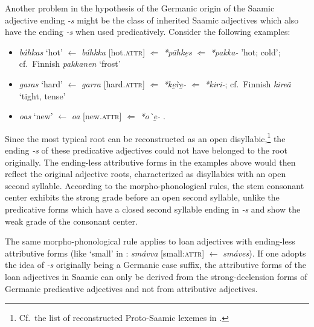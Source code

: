 {Another problem in the hypothesis of the Germanic origin of the Saamic adjective ending \textit{-s} might be the class of inherited Saamic adjectives which also have the ending \textit{-s} when used predicatively. Consider the following examples:
\begin{itemize}
\item {} \textit{báhkas} ‘hot’ $\leftarrow$ \textit{báhkka} [hot.\textsc{attr}] $\Leftarrow$  \textit{*pāhke̮s} $\Leftarrow$  \textit{*pakka-} 'hot; cold’; cf.~Finnish \textit{pakkanen} ‘frost’ \citep[230]{sammallahti1998b}
\item {} \textit{garas} ‘hard’ $\leftarrow$ \textit{garra} [hard.\textsc{attr}] $\Leftarrow$  \textit{*ke̮\`re̮-} $\Leftarrow$  \textit{*kiri-}; cf.~Finnish \textit{kireä} ‘tight, tense’ \citep[242]{sammallahti1998b}
\item {} \textit{o{\dj}as} ‘new’ $\leftarrow$ \textit{o{\dj}{\dj}a} [new.\textsc{attr}] $\Leftarrow$  \textit{*o\`{\dh}e̮-} \citep[258]{sammallahti1998b}.
\end{itemize}

Since the most typical  root can be reconstructed as an open disyllabic,\footnote{Cf.~the list of reconstructed Proto\hyp{}Saamic lexemes in \citet{lehtiranta1989}.} the ending \textit{-s} of these predicative adjectives could not have belonged to the root originally. The ending-less attributive forms in the examples above would then reflect the original adjective roots, characterized as disyllabics with an open second syllable. According to the  morpho-phonological rules, the stem consonant center exhibits the strong grade before an open second syllable, unlike the predicative forms which have a closed second syllable ending in \textit{-s} and show the weak grade of the consonant center.

The same morpho-phonological rule applies to loan adjectives with ending-less attributive forms (like ‘small’ in : \textit{smávva} [small:\textsc{attr}] $\leftarrow$ \textit{smáves}). If one adopts the idea of \textit{-s} originally being a Germanic case suffix, the attributive forms of the loan adjectives in Saamic can only be derived from the strong-declension forms of Germanic predicative adjectives and not from attributive adjectives.

}
